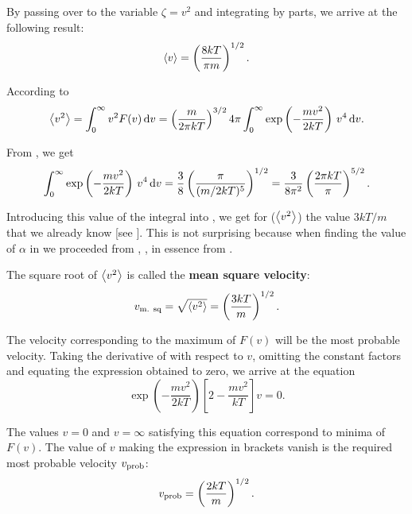 \noindent
By passing over to the variable $\zeta=v^2$ and integrating by parts, we arrive at the following result:
\begin{equation}\label{eq:11_65}
	\left\langle v \right\rangle = \left(\frac{8kT}{\pi m}\right)^{1/2}.
\end{equation}

According to 
\begin{equation}\label{eq:11_66}
	\left\langle v^2 \right\rangle = \int_{0}^{\infty} v^2F(v)\,\mathrm{d} v = \left(\frac{m}{2\pi kT}\right)^{3/2} 4\pi \int_{0}^{\infty} \exp\left(-\frac{mv^2}{2kT}\right)\,v^4\,\mathrm{d} v.
\end{equation}

\noindent
From , we get
\begin{equation*}
	\int_{0}^{\infty} \exp\left(-\frac{mv^2}{2kT}\right)\,v^4\,\mathrm{d} v = \frac{3}{8} \left(\frac{\pi}{(m/2kT)^5}\right)^{1/2} = \frac{3}{8\pi^2}\left(\frac{2\pi kT}{\pi}\right)^{5/2}.
\end{equation*}

\noindent
Introducing this value of the integral into , we get for ($\left\langle v^2 \right\rangle$) the value $3kT/m$ that we already know [see ]. This is not surprising because when finding the value of $\alpha$ in  we proceeded from , \ie, in essence from .

The square root of $\left\langle v^2 \right\rangle$ is called the \textbf{mean square velocity}:
\begin{equation}\label{eq:11_67}
	v_{\text{m. sq}} = \sqrt{\left\langle v^2 \right\rangle} = \left(\frac{3kT}{m}\right)^{1/2}.
\end{equation}

The velocity corresponding to the maximum of $F(v)$ will be the most probable velocity. Taking the derivative of  with respect to $v$, omitting the constant factors and equating the expression obtained to zero, we arrive at the equation
\begin{equation*}
	\exp\left(-\frac{mv^2}{2kT}\right)\left[2 - \frac{mv^2}{kT}\right] v = 0.
\end{equation*}

\noindent
The values $v=0$ and $v=\infty$ satisfying this equation correspond to minima of $F(v)$. The value of $v$ making the expression in brackets vanish is the required most probable velocity $v_{\text{prob}}$:
\begin{equation}\label{eq:11_68}
	v_{\text{prob}} = \left(\frac{2kT}{m}\right)^{1/2}.
\end{equation}

